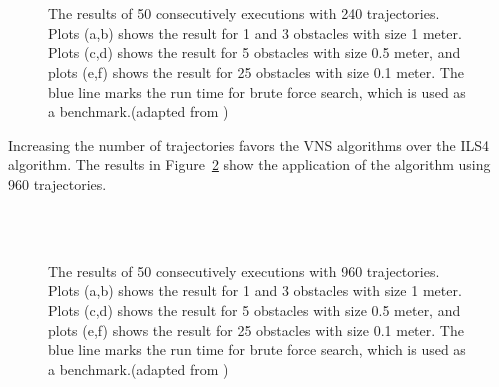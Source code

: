 \begin{figure}[thb]
   \myfloatalign
    \tiny
          \centering
    \\
    \\
    \caption[Experiment: Specific instances with 240 trajectories]{The results of 50 consecutively executions with 240 trajectories. Plots (a,b) shows the result for 1 and 3 obstacles with size 1 meter. Plots (c,d) shows the result for 5 obstacles with size 0.5 meter, and plots (e,f) shows the result for 25 obstacles with size 0.1 meter. The blue line marks the run time for brute force search, which is used as a benchmark.(adapted from \cite{myself})}  
     \label{fig:fig_special_240}
\end{figure}

Increasing the number of trajectories favors the VNS algorithms over the ILS4 algorithm. The results in Figure~\ref{fig:fig_special_960} show the application of the algorithm using 960 trajectories.

\begin{figure}[thb]
   \myfloatalign
    \tiny
          \centering
    \\
    \\
    \caption[Experiment: Specific instances with 960 trajectories]{The results of 50 consecutively executions with 960 trajectories. Plots (a,b) shows the result for 1 and 3 obstacles with size 1 meter. Plots (c,d) shows the result for 5 obstacles with size 0.5 meter, and plots (e,f) shows the result for 25 obstacles with size 0.1 meter. The blue line marks the run time for brute force search, which is used as a benchmark.(adapted from \cite{myself})}  
     \label{fig:fig_special_960}
\end{figure}
   

